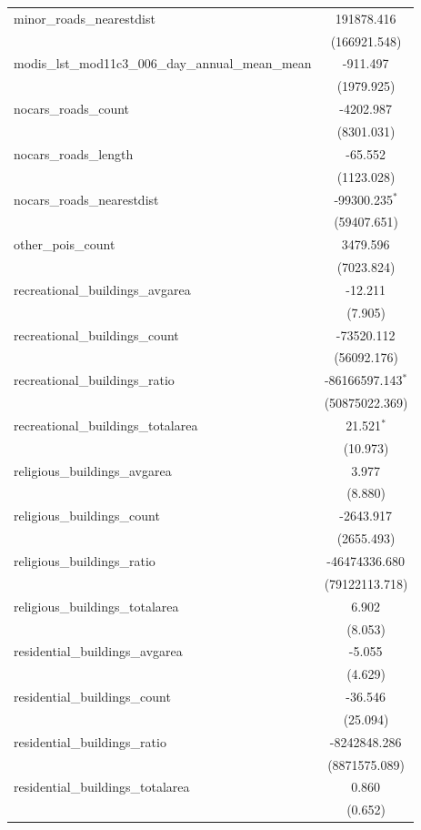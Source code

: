 \begin{table}[!htbp]
\begin{tabular}{@{\extracolsep{5pt}}lc}
 minor_roads_nearestdist & 191878.416$^{}$ \\
  & (166921.548) \\
 modis_lst_mod11c3_006_day_annual_mean_mean & -911.497$^{}$ \\
  & (1979.925) \\
 nocars_roads_count & -4202.987$^{}$ \\
  & (8301.031) \\
 nocars_roads_length & -65.552$^{}$ \\
  & (1123.028) \\
 nocars_roads_nearestdist & -99300.235$^{*}$ \\
  & (59407.651) \\
 other_pois_count & 3479.596$^{}$ \\
  & (7023.824) \\
 recreational_buildings_avgarea & -12.211$^{}$ \\
  & (7.905) \\
 recreational_buildings_count & -73520.112$^{}$ \\
  & (56092.176) \\
 recreational_buildings_ratio & -86166597.143$^{*}$ \\
  & (50875022.369) \\
 recreational_buildings_totalarea & 21.521$^{*}$ \\
  & (10.973) \\
 religious_buildings_avgarea & 3.977$^{}$ \\
  & (8.880) \\
 religious_buildings_count & -2643.917$^{}$ \\
  & (2655.493) \\
 religious_buildings_ratio & -46474336.680$^{}$ \\
  & (79122113.718) \\
 religious_buildings_totalarea & 6.902$^{}$ \\
  & (8.053) \\
 residential_buildings_avgarea & -5.055$^{}$ \\
  & (4.629) \\
 residential_buildings_count & -36.546$^{}$ \\
  & (25.094) \\
 residential_buildings_ratio & -8242848.286$^{}$ \\
  & (8871575.089) \\
 residential_buildings_totalarea & 0.860$^{}$ \\
  & (0.652) \\

\end{tabular}
\end{table}
